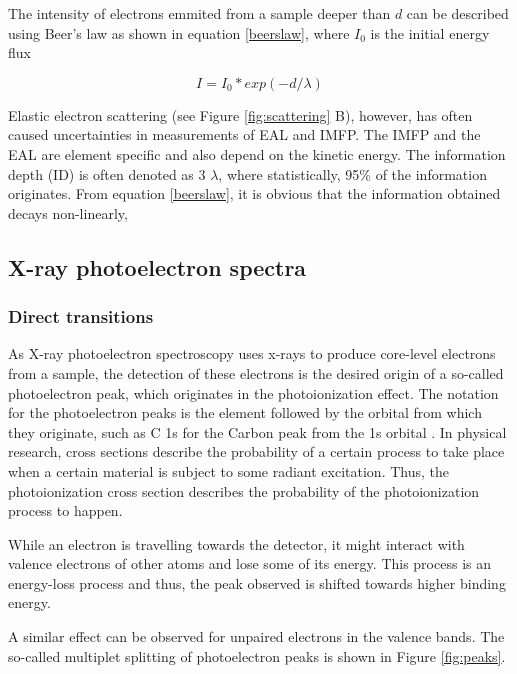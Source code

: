 The intensity of electrons emmited from a sample deeper than $d$ can be described using Beer's law as shown in equation \ref{beerslaw}, where $I_{0}$ is the initial energy flux

\begin{equation}
\label{beerslaw}
    I = I_{0} * exp(-d/\lambda)
\end{equation}

Elastic electron scattering (see Figure \ref{fig:scattering} B), however, has often caused uncertainties in measurements of EAL and IMFP. The IMFP and the EAL are element specific and also depend on the kinetic energy. 
The information depth (ID) is often denoted as 3 $\lambda$, where statistically, 95\% of the information originates. From equation \ref{beerslaw}, it is obvious that the information obtained decays non-linearly, 

\subsection{X-ray photoelectron spectra} %
\subsubsection{Direct transitions}
As X-ray photoelectron spectroscopy uses x-rays to produce core-level electrons from a sample, the detection of these electrons is the desired origin of a so-called photoelectron peak, which originates in the photoionization effect. The notation for the photoelectron peaks is the element followed by the orbital from which they originate, such as C 1s for the Carbon peak from the 1s orbital \cite{stevie_introduction_2020}. In physical research, cross sections describe the probability of a certain process to take place when a certain material is subject to some radiant excitation. Thus, the photoionization cross section describes the probability of the photoionization process to happen. 

While an electron is travelling towards the detector, it might interact with valence electrons of other atoms and lose some of its energy. This process is an energy-loss process and thus, the peak observed is shifted towards higher binding energy.

A similar effect can be observed for unpaired electrons in the valence bands. The so-called multiplet splitting of photoelectron peaks is shown in Figure \ref{fig:peaks}.

